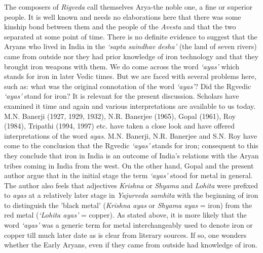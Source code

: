 The composers of \textit{Rigveda} call themselves Arya-the noble one, a fine or superior people. It is well known and needs no elaborations here that there was some kinship bond between them and the people of the \textit{Avesta} and that the two separated at some point of time. There is no definite evidence to suggest that the Aryans who lived in India in the \textit{‘sapta saindhav desha’} (the land of seven rivers) came from outside nor they had prior knowledge of iron technology and that they brought iron weapons with them. We do come across the word \textit{‘ayas’} which stands for iron in later Vedic times. But we are faced with several problems here, such as: what was the original connotation of the word \textit{‘ayas’}? Did the Rgvedic \textit{‘ayas’} stand for iron? It is relevant for the present discussion. Scholars have examined it time and again and various interpretations are available to us today. M.N. Banerji (1927, 1929, 1932), N.R. Banerjee (1965), Gopal (1961), Roy (1984), Tripathi (1994, 1997) etc. have taken a close look and have offered interpretations of the word \textit{ayas}. M.N. Banerji, N.R. Banerjee and S.N. Roy have come to the conclusion that the Rgvedic \textit{‘ayas’} stands for iron; consequent to this they conclude that iron in India is an outcome of India’s relations with the Aryan tribes coming in India from the west. On the other hand, Gopal and the present author argue that in the initial stage the term \textit{‘ayas’} stood for metal in general. The author also feels that adjectives \textit{Krishna}  or \textit{Shyama} and \textit{Lohita} were prefixed to \textit{ayas} at a relatively later stage in \textit{Yajurveda samhita} with the beginning of iron to distinguish the 'black metal' (\textit{Krishna ayas} or \textit{Shyama ayas} = iron) from the red metal (\textit{‘Lohita ayas'} = copper). As stated above, it is more likely that the word \textit{‘ayas’} was a generic term for metal interchangeably used to denote iron or copper till much later date as is clear from literary sources. If so, one wonders whether the Early Aryans, even if they came from outside had knowledge of iron.

